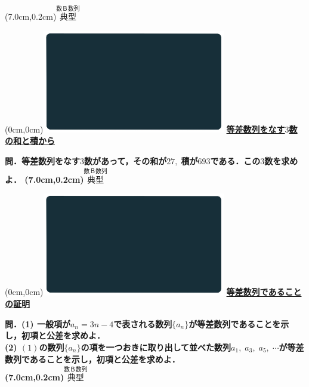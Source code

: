 \documentclass[10pt,
fleqn,
dvipdfmx,
uplatex
]{jsarticle}
\begin{document}
\at(7.0cm,0.2cm){\small\color{bradorange}$\overset{\text{数Ｂ数列}}{\text{典型}}$}


\newpage



\at(0cm,0cm){\includegraphics[width=8cm,bb=0 0 1920 1080]{./youtube/thumbnails/templates/smart_background/数B数列.jpeg}}
{\color{orange}\bf\boldmath\Large\underline{等差数列をなす$3$数の和と積から}}\vspace{0.3zw}

\LARGE 
\bf\boldmath 問．等差数列をなす$3$数があって，その和が${27},\;$積が${693}$である．この$3$数を求めよ．
\at(7.0cm,0.2cm){\small\color{bradorange}$\overset{\text{数Ｂ数列}}{\text{典型}}$}


\newpage



\at(0cm,0cm){\includegraphics[width=8cm,bb=0 0 1920 1080]{./youtube/thumbnails/templates/smart_background/数B数列.jpeg}}
{\color{orange}\bf\boldmath\Large\underline{等差数列であることの証明}}\vspace{0.3zw}

\normalsize 
\bf\boldmath 問．(1)  一般項が$a_n=3n-4$で表される数列$\{a_n\}$が等差数列であることを示し，初項と公差を求めよ．\\
(2)  $\left(1\right)$の数列$\{a_n\}$の項を一つおきに取り出して並べた数列$a_1,\;a_3,\;a_5,\;\cdots$が等差数列であることを示し，初項と公差を求めよ．\\

\at(7.0cm,0.2cm){\small\color{bradorange}$\overset{\text{数Ｂ数列}}{\text{典型}}$}


\newpage
\end{document}
